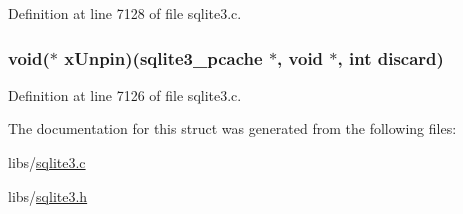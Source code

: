 Definition at line 7128 of file sqlite3.\+c.

\hypertarget{structsqlite3__pcache__methods_a0179cdf335a93eb2be5b94a6c2754a94}{}
\subsubsection[{x\+Unpin}]{\setlength{\rightskip}{0pt plus 5cm}void($\ast$ x\+Unpin)({\bf sqlite3\+\_\+pcache} $\ast$, void $\ast$, int discard)}\label{structsqlite3__pcache__methods_a0179cdf335a93eb2be5b94a6c2754a94}


Definition at line 7126 of file sqlite3.\+c.



The documentation for this struct was generated from the following files\+:\begin{DoxyCompactItemize}
\item 
libs/\hyperlink{sqlite3_8c}{sqlite3.\+c}\item 
libs/\hyperlink{sqlite3_8h}{sqlite3.\+h}\end{DoxyCompactItemize}
